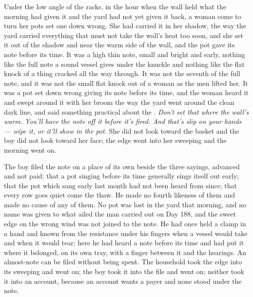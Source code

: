 Under the low angle of the racks, in the hour when the wall held what the morning had given it and the yard had not yet given it back, a woman come to turn her pots set one down wrong. She had carried it in her shadow, the way the yard carried everything that must not take the wall's heat too soon, and she set it out of the shadow and near the warm side of the wall, and the pot gave its note before its time. It was a high thin note, small and bright and early, nothing like the full note a sound vessel gives under the knuckle and nothing like the flat knock of a thing cracked all the way through. It was not the seventh of the full note, and it was not the small flat knock out of a woman as the men lifted her. It was a pot set down wrong giving its note before its time, and the woman heard it and swept around it with her broom the way the yard went around the clean dark line, and said something practical about the . \emph{Don't set that where the wall's warm. You'll have the note off it before it's fired. And that's slip on your hands --- wipe it, or it'll show in the pot.} She did not look toward the basket and the boy did not look toward her face; the edge went into her sweeping and the morning went on.

The boy filed the note on a place of its own beside the three sayings, advanced and not paid: that a pot singing before its time generally sings itself out early; that the pot which sang early last month had not been heard from since; that every row goes quiet come the thaw. He made no fourth likeness of them and made no cause of any of them. No pot was lost in the yard that morning, and no name was given to what ailed the man carried out on Day 188, and the sweet edge on the wrong wind was not joined to the note. He had once held a clamp in a hand and known from the resistance under his fingers when a vessel would take and when it would tear; here he had heard a note before its time and had put it where it belonged, on its own tray, with a finger between it and the hearings. An almost-note can be filed without being spent. The household took the edge into its sweeping and went on; the boy took it into the file and went on; neither took it into an account, because an account wants a payer and none stood under the note.

\scenebreak

